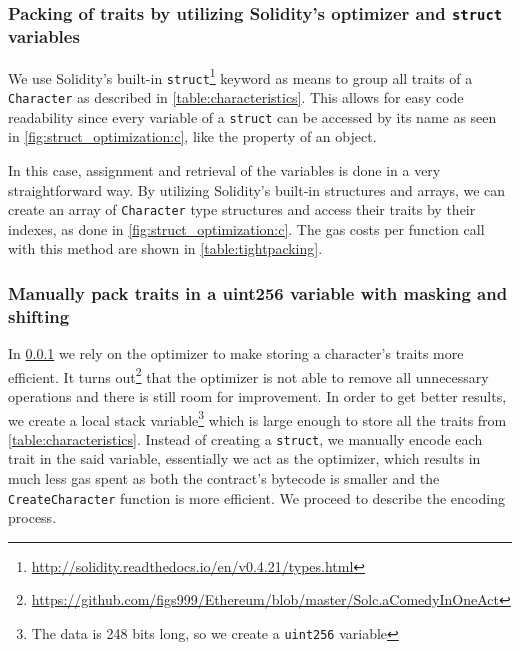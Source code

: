 \subsubsection{Packing of traits by utilizing Solidity's optimizer and \texttt{struct} variables} \label{method1}
We use Solidity's built-in \texttt{struct}\footnote{\url{http://solidity.readthedocs.io/en/v0.4.21/types.html}} keyword as means to group all traits of a \texttt{Character} as described in \ref{table:characteristics}. This allows for easy code readability since every variable of a \texttt{struct} can be accessed by its name as seen in \ref{fig:struct_optimization:c}, like the property of an object. 



In this case, assignment and retrieval of the variables is done in a very straightforward way. By utilizing Solidity's built-in structures and arrays, we can create an array of \texttt{Character} type structures and access their traits by their indexes, as done in \ref{fig:struct_optimization:c}. The gas costs per function call with this method are shown in \ref{table:tightpacking}.



\subsubsection{Manually pack traits in a uint256 variable with masking and shifting} \label{method2}
    
In \ref{method1} we rely on the optimizer to make storing a character's traits more efficient. It turns out\footnote{\url{https://github.com/figs999/Ethereum/blob/master/Solc.aComedyInOneAct}} that the optimizer is not able to remove all unnecessary operations and there is still room for improvement. In order to get better results, we create a local stack variable\footnote{The data is 248 bits long, so we create a \texttt{uint256} variable} which is large enough to store all the traits from \ref{table:characteristics}. Instead of creating a \texttt{struct}, we manually encode each trait in the said variable, essentially we act as the optimizer, which results in much less gas spent as both the contract's bytecode is smaller and the \texttt{CreateCharacter} function is more efficient. We proceed to describe the encoding process.




